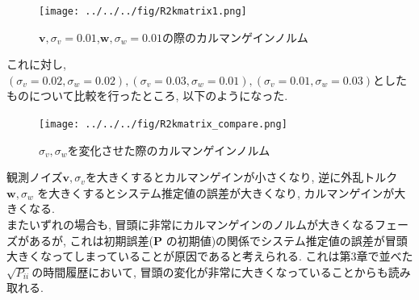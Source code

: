 \documentclass[dvipdfmx, fleqn, uplatex, a4paper]{jsarticle}
\begin{document}
\begin{figure}[H]
  \begin{center}
  \texttt{[image: ../../../fig/R2kmatrix1.png]}
  \caption{$\bm{v}, \sigma_v = 0.01$,$\bm{w}, \sigma_w = 0.01$の際のカルマンゲインノルム}
\end{center}
\end{figure}

これに対し, $(\sigma_v = 0.02, \sigma_w = 0.02), (\sigma_v = 0.03, \sigma_w = 0.01),
(\sigma_v = 0.01, \sigma_w = 0.03)$としたものについて比較を行ったところ,
以下のようになった.
\begin{figure}[H]
  \begin{center}
  \texttt{[image: ../../../fig/R2kmatrix\_compare.png]}
  \caption{$\sigma_v,\sigma_w$を変化させた際のカルマンゲインノルム}
\end{center}
\end{figure}

観測ノイズ$\bm{v}, \sigma_v$を大きくするとカルマンゲインが小さくなり, 逆に外乱トルク$\bm{w}, \sigma_w$
を大きくするとシステム推定値の誤差が大きくなり, カルマンゲインが大きくなる. \\
またいずれの場合も, 冒頭に非常にカルマンゲインのノルムが大きくなるフェーズがあるが, これは初期誤差($\bm{P}$
の初期値)の関係でシステム推定値の誤差が冒頭大きくなってしまっていることが原因であると考えられる.
これは第3章で並べた$\sqrt{P_{ii}}$の時間履歴において, 冒頭の変化が非常に大きくなっていることからも読み取れる.
\end{document}
